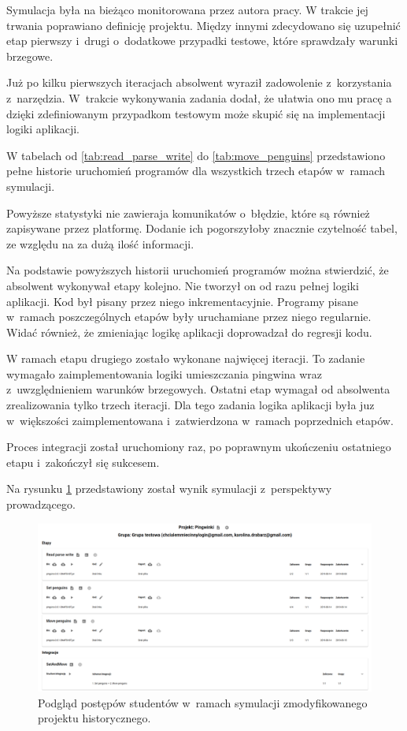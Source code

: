 Symulacja była na bieżąco monitorowana przez autora pracy.
W trakcie jej trwania poprawiano definicję projektu.
Między innymi zdecydowano się uzupełnić etap pierwszy i~drugi o~dodatkowe przypadki testowe, które sprawdzały warunki brzegowe.

Już po kilku pierwszych iteracjach absolwent wyraził zadowolenie z~korzystania z~narzędzia.
W~trakcie wykonywania zadania dodał, że ułatwia ono mu pracę a dzięki zdefiniowanym przypadkom testowym może skupić się na implementacji logiki aplikacji.

W tabelach od \ref{tab:read_parse_write} do \ref{tab:move_penguins} przedstawiono pełne historie uruchomień programów dla wszystkich trzech etapów w~ramach symulacji.









Powyższe statystyki nie zawieraja komunikatów o~błędzie, które są również zapisywane przez platformę.
Dodanie ich pogorszyłoby znacznie czytelność tabel, ze względu na za dużą ilość informacji.

Na podstawie powyższych historii uruchomień programów można stwierdzić, że absolwent wykonywał etapy kolejno.
Nie tworzył on od razu pełnej logiki aplikacji.
Kod był pisany przez niego inkrementacyjnie.
Programy pisane w~ramach poszczególnych etapów były uruchamiane przez niego regularnie.
Widać również, że zmieniając logikę aplikacji doprowadzał do regresji kodu.

W ramach etapu drugiego zostało wykonane najwięcej iteracji.
To zadanie wymagało zaimplementowania logiki umieszczania pingwina wraz z~uwzględnieniem warunków brzegowych.
Ostatni etap wymagał od absolwenta zrealizowania tylko trzech iteracji.
Dla tego zadania logika aplikacji była juz w~większości zaimplementowana i~zatwierdzona w~ramach poprzednich etapów.

Proces integracji został uruchomiony raz, po poprawnym ukończeniu ostatniego etapu i~zakończył się sukcesem.

Na rysunku \ref{fig:penguins_simulation_interface} przedstawiony został wynik symulacji z~perspektywy prowadzącego.

\begin{figure}[h]
    \centering
    \includegraphics[width = 16cm]{chapter07/penguins_preview.png}
    \caption{Podgląd postępów studentów w~ramach symulacji zmodyfikowanego projektu historycznego.}
    \label{fig:penguins_simulation_interface}
\end{figure}


